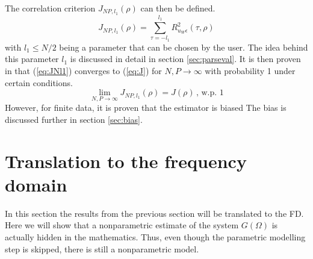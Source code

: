 The correlation criterion $J_{N\!P,l_1}(\rho)$ can then be defined.
\begin{equation}
\boxed{
    J_{N\!P,l_1}(\rho) = \sum_{\tau=-l_1}^{l_1} R_{u_W \epsilon}^2(\tau,\rho)
}
\label{eq:JNl1}
\end{equation}
with $l_1 \leq N/2$ being a parameter that can be chosen by the user. The idea behind this parameter $l_1$ is discussed in detail in section \ref{sec:parseval}. It is then proven in \cite[Appendix II]{Data-driven_model_reference_control} that (\ref{eq:JNl1}) converges to (\ref{eq:J}) for $N,P \rightarrow \infty$ with probability 1 under certain conditions.
\begin{equation*}
    \lim_{N,P\rightarrow \infty} J_{N\!P,l_1}(\rho) = J(\rho) \,,\, \text{w.p. } 1
\end{equation*}
However, for finite data, it is proven that the estimator is biased \cite[eq. (37)]{Data-driven_model_reference_control}
The bias is discussed further in section \ref{sec:bias}.

\section{Translation to the frequency domain}
\label{sec:freq_domain_translate}
In this section the results from the previous section will be translated to the FD. Here we will show that a nonparametric estimate of the system $G(\Omega)$ is actually hidden in the mathematics. Thus, even though the parametric modelling step is skipped, there is still a nonparametric model.


